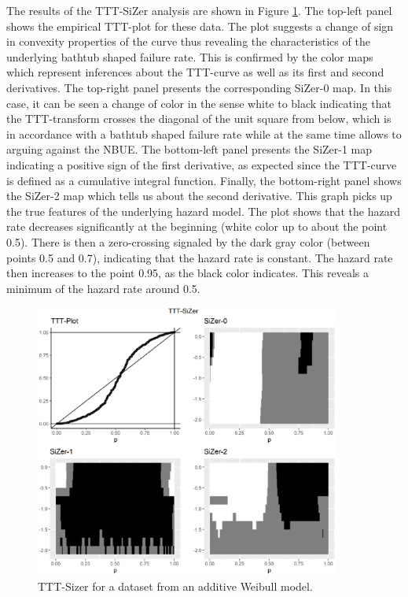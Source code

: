 \documentclass[preprint,12pt]{elsarticle}
\begin{document}
The results of the TTT-SiZer analysis are shown in Figure \ref{Fig:simulatedSizer}. The top-left panel shows the empirical TTT-plot for these data. The plot suggests a change of sign in convexity properties of the curve thus revealing the characteristics of the underlying  bathtub shaped failure rate. This is confirmed by the color maps which represent inferences about the TTT-curve as well as its first and second derivatives. The top-right panel presents the corresponding SiZer-0 map. In this case, it can be seen a change of color in the sense white to black indicating that the TTT-transform crosses the diagonal of the unit square from below, which is in accordance with a bathtub shaped failure rate while at the same time allows to arguing against the NBUE. The bottom-left panel presents the SiZer-1 map indicating a positive sign of the first derivative, as expected since the TTT-curve is defined as a cumulative integral function. Finally, the bottom-right panel shows the SiZer-2 map which tells us about the second derivative. This graph picks up the true features of the underlying hazard model. 
The plot shows that the hazard rate decreases significantly at the beginning (white color up to about the point 0.5). There is then a zero-crossing  signaled by the dark gray color  (between points 0.5 and 0.7), indicating that the hazard rate is constant. The hazard rate then increases to the point 0.95, as the black color indicates. This reveals a minimum of the hazard rate around 0.5.
  

\begin{figure}[htb]
\begin{center}
\includegraphics[height=9cm]{Fig2_motivatingSiZerCubic_log10}%
\caption{TTT-Sizer for a dataset from an additive Weibull model.}\label{Fig:simulatedSizer}
\end{center}
\end{figure}
\end{document}
